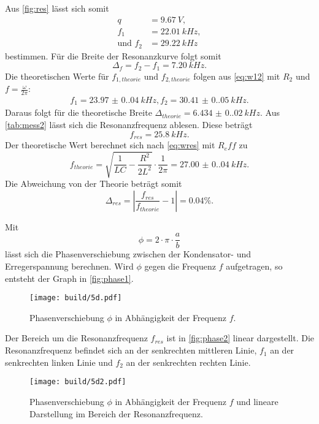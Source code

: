 Aus \autoref{fig:res} lässt sich somit
\begin{align*}
  q &= \SI{9.67}{V}, \\
  f_1 &= \SI{22.01}{kHz}, \\
  \text{und } f_2 &= \SI{29.22}{kHz}
\end{align*}
bestimmen. Für die Breite der Resonanzkurve folgt somit
\begin{equation*}
  \Delta_f = f_2 - f_1 = \SI{7.20}{kHz}.
\end{equation*}
\newpage
Die theoretischen Werte für $f_{1, theorie}$ und $f_{2, theorie}$ folgen aus \autoref{eq:w12} mit $R_2$ und $f = \frac{\omega}{2\pi}$:
\begin{align*}
  f_1 = \SI{23.97(0.04)}{kHz},
  f_2 = \SI{30.41(0.05)}{kHz}.
\end{align*}
Daraus folgt für die theoretische Breite $\Delta_{theorie} = \SI{6.434(0.020)}{kHz}$.
Aus \autoref{tab:mess2} lässt sich die Resonanzfrequenz ablesen. Diese beträgt
\begin{equation*}
  f_{res} = \SI{25.8}{kHz}.
\end{equation*}
Der theoretische Wert berechnet sich nach \autoref{eq:wres} mit $R_eff$ zu 
\begin{equation*}
  f_{theorie} = \sqrt{\frac{1}{LC} - \frac{R^2}{2L^2}} \cdot \frac{1}{2\pi} = \SI{27.00(0.04)}{kHz}.
\end{equation*}
Die Abweichung von der Theorie beträgt somit 
\begin{equation*}
  \Delta_{res} = |\frac{f_{res}}{f_{theorie}} - 1| = 0.04\%.
\end{equation*}

Mit 
\begin{equation*}
  \phi = 2 \cdot \pi \cdot \frac{a}{b}
\end{equation*}
lässt sich die Phasenverschiebung zwischen der Kondensator- und Erregerspannung berechnen.
Wird $\phi$ gegen die Frequenz $f$ aufgetragen, so entsteht der Graph in \autoref{fig:phase1}.
\begin{figure}[H]
  \texttt{[image: build/5d.pdf]}
  \caption{Phasenverschiebung $\phi$ in Abhängigkeit der Frequenz $f$.}
  \label{fig:phase1}
\end{figure}
Der Bereich um die Resonanzfrequenz $f_{res}$ ist in \autoref{fig:phase2} linear dargestellt. Die Resonanzfrequenz befindet sich an der senkrechten
mittleren Linie, $f_1$ an der senkrechten linken Linie und $f_2$ an der senkrechten rechten Linie.
\begin{figure}[H]
  \texttt{[image: build/5d2.pdf]}
  \caption{Phasenverschiebung $\phi$ in Abhängigkeit der Frequenz $f$ und lineare Darstellung im Bereich der Resonanzfrequenz.}
  \label{fig:phase2}
\end{figure}







\newpage
